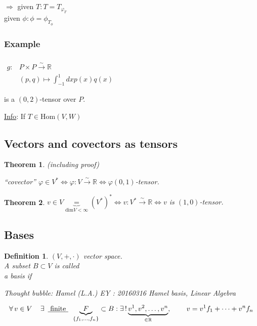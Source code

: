 \documentclass[10pt, twoside]{amsart}
\newtheorem{theorem}{Theorem}
\newtheorem{definition}{Definition}
\begin{document}
\begin{multicols*}{2}
$\Longrightarrow $ given $T: T = T_{\varphi_T}$ \\
\phantom{$\Longrightarrow$} given $\phi: \phi = \phi_{T_{\phi}}$

\subsubsection*{Example} $\begin{aligned} & \quad \\
  g: & P \times P \xrightarrow{ \sim } \mathbb{R} \\
  & (p,q) \mapsto \int_{-1}^1 dx p(x) q(x) \end{aligned}$

is a $(0,2)$-tensor over $P$.  

\underline{Info}: If $T \in \text{Hom}(V,W)$

\subsection{Vectors and covectors as tensors}

\begin{theorem} (including proof)

``covector''  $\varphi \in V^* \Longleftrightarrow \varphi : V \xrightarrow{ \sim } \mathbb{R} \Longleftrightarrow \varphi (0,1)$-tensor.  
\end{theorem}

\begin{theorem}
$v\in V \underbrace{=}_{\text{dim}V<\infty} (V^*)^* \Longleftrightarrow v: V^* \xrightarrow{ \sim} \mathbb{R} \Longleftrightarrow v $ is $(1,0)$-tensor.  
\end{theorem}

\subsection{Bases}

\begin{definition}
  $(V,+,\cdot)$ vector space. \\
A subset $B\subset V$ is called \\
a basis if 

Thought bubble: Hamel (L.A.) EY : 20160316 Hamel basis, Linear Algebra

\[
\forall \, v \in V \quad \, \exists \, \text{ \underline{ finite } } \, \underbrace{F}_{ \lbrace f_1 , \dots , f_n \rbrace }  \subset B : \exists \, ! \underbrace{ v^1, v^2 , \dots , v^n }_{ \in \mathbb{R} },  \qquad \, v = v^1 f_1 + \dots + v^n f_n 
\]
\end{definition}


\end{multicols*}
\end{document}

